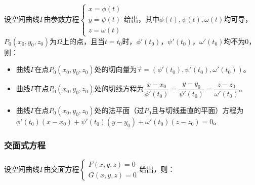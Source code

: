 \documentclass[UTF8, 12pt]{ctexart}
\begin{document}
设空间曲线$\varGamma$由参数方程$\left\{\begin{array}{l}
    x=\phi(t) \\
    y=\psi(t) \\
    z=\omega(t)
\end{array}\right.$给出，其中$\phi(t),\psi(t),\omega(t)$均可导，$P_0(x_0,y_0,z_0)$为$\varOmega$上的点，且当$t=t_0$时，$\phi'(t_0)$，$\psi'(t_0)$，$\omega'(t_0)$均不为0，则：

\begin{itemize}
    \item 曲线$\varGamma$在点$P_0(x_0,y_0,z_0)$处的切向量为$\vec{\tau}=(\phi'(t_0),\psi'(t_0),\omega'(t_0))$。
    \item 曲线$\varGamma$在点$P_0(x_0,y_0,z_0)$处的切线方程为$\dfrac{x-x_0}{\phi'(t_0)}=\dfrac{y-y_0}{\psi'(t_0)}=\dfrac{z-z_0}{\omega'(t_0)}$。
    \item 曲线$\varGamma$在点$P_0(x_0,y_0,z_0)$处的法平面（过$P_0$且与切线垂直的平面）方程为$\phi'(t_0)(x-x_0)+\psi'(t_0)(y-y_0)+\omega'(t_0)(z-z_0)=0$。
\end{itemize}

\subsubsection{交面式方程}

设空间曲线$\varGamma$由交面方程$\left\{\begin{array}{l}
    F(x,y,z)=0 \\
    G(x,y,z)=0
\end{array}\right.$给出，则：
\end{document}
